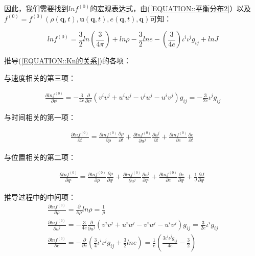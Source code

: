 \documentclass[LBMDerivation.tex]{subfiles}
\begin{document}
因此，我们需要找到$ln f^{(0)}$的宏观表达式，由(\ref{EQUATION::平衡分布2}）以及$f^{(0)}=f^{(0)}(\rho(\boldsymbol{q},t),\boldsymbol{u}(\boldsymbol{q},t),e(\boldsymbol{q},t),\boldsymbol{q})$可知：


\begin{equation}
  ln f^{(0)} = \frac{3}{2} ln(\frac{3}{4\pi}) + ln \rho - \frac{3}{2} ln e - (\frac{3}{4e}){\iota^i\iota^jg_{ij}}+ln J
\end{equation}


推导(\ref{EQUATION::Kn的关系})的各项：

与速度相关的第三项：

\begin{equation}
  \begin{gathered}
    \frac{\partial ln f^{(0)}}{\partial v^i} =
    -\frac{3}{4e} \frac{\partial}{\partial v^i}(v^iv^j+u^iu^j-v^iu^j-u^iv^j)g_{ij}=-\frac{3}{2e}\iota^j g_{ij}
  \end{gathered}
\end{equation}

与时间相关的第一项：

\begin{equation}
  \begin{gathered}
    \frac{\partial ln f^{(0)}}{\partial t} =
    \frac{\partial ln f^{(0)}}{\partial \rho} \frac{\partial \rho}{\partial t} +     \frac{\partial ln f^{(0)}}{\partial u^j} \frac{\partial u^j}{\partial t} +     \frac{\partial ln f^{(0)}}{\partial e} \frac{\partial e}{\partial t}
  \end{gathered}
  \label{EQUATION::推导lnt} ~
\end{equation}



与位置相关的第二项：

\begin{equation}
  \begin{gathered}
    \frac{\partial ln f^{(0)}}{\partial q^i} =
    \frac{\partial ln f^{(0)}}{\partial \rho} \frac{\partial \rho}{\partial q^i} +     \frac{\partial ln f^{(0)}}{\partial u^j} \frac{\partial u^j}{\partial q^i} +     \frac{\partial ln f^{(0)}}{\partial e} \frac{\partial e}{\partial q^i} + \frac{1}{J}\frac{\partial J}{\partial q^i}
  \end{gathered}
  \label{EQUATION::推导lnxi} ~
\end{equation}



推导过程中的中间项：
\begin{equation}
  \begin{gathered}
    \frac{\partial ln f^{(0)}}{\partial \rho}=\frac{\partial}{\partial \rho}ln \rho=\frac{1}{\rho} \\
    \frac{\partial ln f^{(0)}}{\partial u^j}=-\frac{3}{4e} \frac{\partial}{\partial u^j}(v^iv^j+u^iu^j-v^iu^j-u^iv^j)g_{ij}=\frac{3}{2e}\iota^i g_{ij} \\
    \frac{\partial ln f^{(0)}}{\partial e}=-\frac{\partial}{\partial e}(\frac{3}{4}{\iota^i\iota^jg_{ij}}+\frac{3}{2} ln e )=\frac{1}{e}(\frac{3 {\iota^i\iota^jg_{ij}}}{4e}-\frac{3}{2})
  \end{gathered}
\end{equation}
\end{document}
